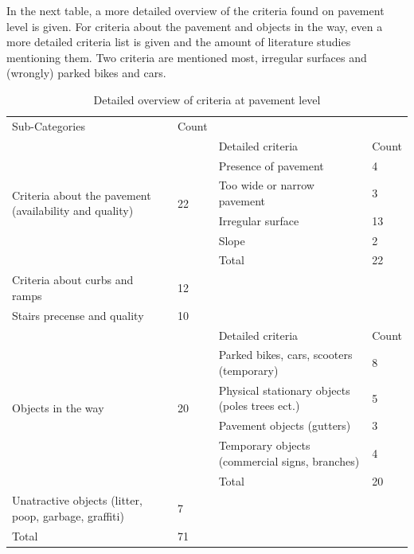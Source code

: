 In the next table, a more detailed overview of the criteria found on pavement level is given. For criteria about the pavement and objects in the way, even a more detailed criteria list is given and the amount of literature studies mentioning them. Two criteria are mentioned most, irregular surfaces and (wrongly) parked bikes and cars. 
\clearpage

\begin{table}[h]
\centering
\caption{Detailed overview of criteria at pavement level \label{literaturepavement}}
\begin{tabular}{|p{135pt}|p{45pt}||p{135pt}|p{45pt}|}
\cline{1-2}
Sub-Categories & Count \\
\cline{1-2} \cline{1-2} \cline{3-4}
\multirow{6}{135pt}{Criteria about the pavement (availability and quality)} &  \multirow{6}{*}{ 22 } & Detailed criteria & Count \\ \cline{3-4}
& & Presence of pavement & 4 \\
& & Too wide or narrow pavement & 3\\
& & Irregular surface & 13 \\
& &  Slope & 2 \\
\cline{3-4}
& &  Total & 22 \\
\hline

Criteria about curbs and ramps & 12 \\
\cline{1-2}
Stairs precense and quality & 10 \\
\hline
\multirow{6}{*}{Objects in the way} &  \multirow{6}{*}{ 20 } & Detailed criteria & Count \\ \cline{3-4}
& & Parked bikes, cars, scooters (temporary) & 8 \\
& & Physical stationary objects (poles trees ect.) & 5\\
& & Pavement objects (gutters) & 3 \\
& &  Temporary objects (commercial signs, branches) & 4 \\
\cline{3-4}
& &  Total & 20\\
\hline
Unatractive objects (litter, poop, garbage, graffiti) & 7 \\
\cline{1-2} \cline{1-2}
Total & 71 \\
\cline{1-2} 
\end{tabular}
\end{table}





